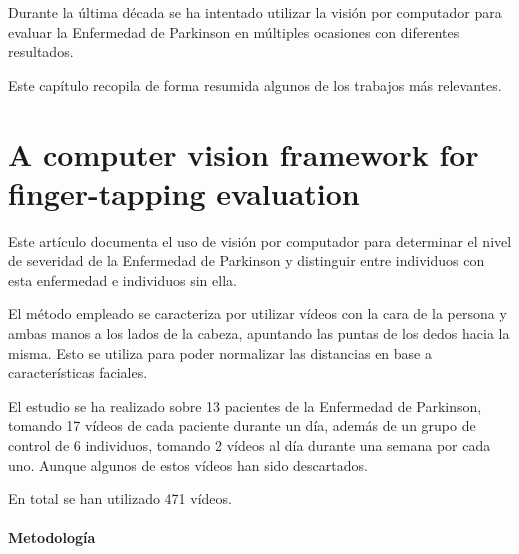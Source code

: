 \label{cha:Trabajos relacionados}

Durante la última década se ha intentado utilizar la visión por computador para
evaluar la Enfermedad de Parkinson en múltiples ocasiones con diferentes
resultados.

Este capítulo recopila de forma resumida algunos de los trabajos más relevantes.


\section{A computer vision framework for finger-tapping evaluation}

Este artículo \cite{khan2014computer} documenta el uso de visión por computador
para determinar el nivel de severidad de la Enfermedad de Parkinson y distinguir
entre individuos con esta enfermedad e individuos sin ella.

El método empleado se caracteriza por utilizar vídeos con la cara de la persona
y ambas manos a los lados de la cabeza, apuntando las puntas de los dedos hacia
la misma. Esto se utiliza para poder normalizar las distancias en base a
características faciales.

El estudio se ha realizado sobre 13 pacientes de la Enfermedad de Parkinson,
tomando 17 vídeos de cada paciente durante un día, además de un grupo de control
de 6 individuos, tomando 2 vídeos al día durante una semana por cada uno. Aunque
algunos de estos vídeos han sido descartados.

En total se han utilizado 471 vídeos.


\paragraph{Metodología}

